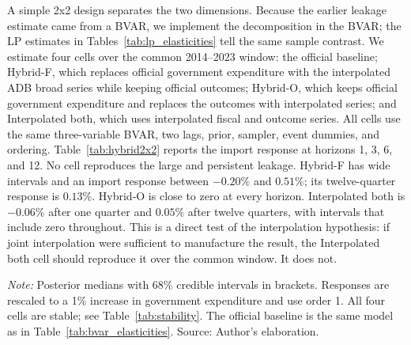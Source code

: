 \documentclass[11pt,a4paper]{article}
\begin{document}
A simple 2x2 design separates the two dimensions. Because the earlier leakage estimate came from a BVAR, we implement the decomposition in the BVAR; the LP estimates in Tables~\ref{tab:lp_elasticities} tell the same sample contrast. We estimate four cells over the common 2014--2023 window: the official baseline; Hybrid-F, which replaces official government expenditure with the interpolated ADB broad series while keeping official outcomes; Hybrid-O, which keeps official government expenditure and replaces the outcomes with interpolated series; and Interpolated both, which uses interpolated fiscal and outcome series. All cells use the same three-variable BVAR, two lags, prior, sampler, event dummies, and ordering. Table~\ref{tab:hybrid2x2} reports the import response at horizons 1, 3, 6, and 12. No cell reproduces the large and persistent leakage. Hybrid-F has wide intervals and an import response between $-0.20\%$ and $0.51\%$; its twelve-quarter response is $0.13\%$. Hybrid-O is close to zero at every horizon. Interpolated both is $-0.06\%$ after one quarter and $0.05\%$ after twelve quarters, with intervals that include zero throughout. This is a direct test of the interpolation hypothesis: if joint interpolation were sufficient to manufacture the result, the Interpolated both cell should reproduce it over the common window. It does not.

\begin{table}[htbp]
\centering
\small
\caption{Common-window 2x2 hybrid design, 2014--2023 (percent)}
\label{tab:hybrid2x2}
\par\vspace{0.3em}
\begin{minipage}{0.95\textwidth}
\footnotesize\textit{Note:} Posterior medians with 68\% credible intervals in brackets. Responses are rescaled to a 1\% increase in government expenditure and use order 1. All four cells are stable; see Table~\ref{tab:stability}. The official baseline is the same model as in Table~\ref{tab:bvar_elasticities}. Source: Author's elaboration.
\end{minipage}
\end{table}
\end{document}
